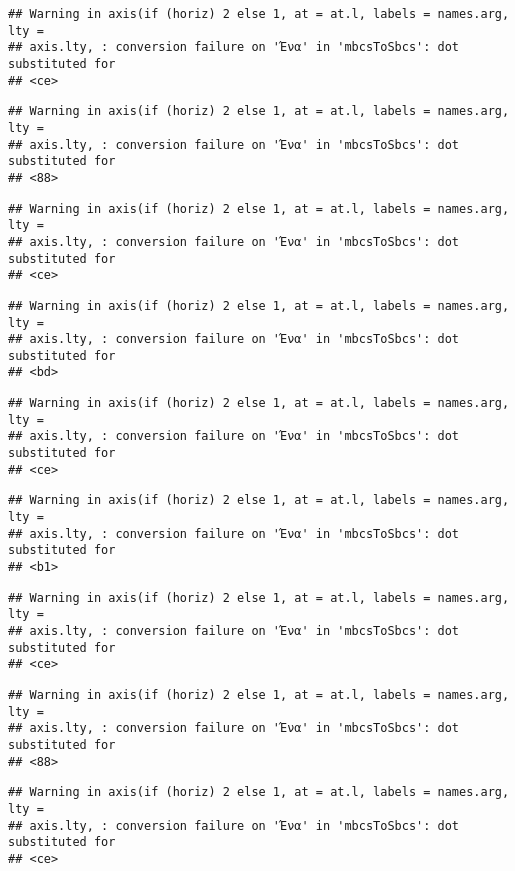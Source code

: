 \documentclass[
]{article}
\begin{document}
\begin{verbatim}
## Warning in axis(if (horiz) 2 else 1, at = at.l, labels = names.arg, lty =
## axis.lty, : conversion failure on 'Ένα' in 'mbcsToSbcs': dot substituted for
## <ce>
\end{verbatim}

\begin{verbatim}
## Warning in axis(if (horiz) 2 else 1, at = at.l, labels = names.arg, lty =
## axis.lty, : conversion failure on 'Ένα' in 'mbcsToSbcs': dot substituted for
## <88>
\end{verbatim}

\begin{verbatim}
## Warning in axis(if (horiz) 2 else 1, at = at.l, labels = names.arg, lty =
## axis.lty, : conversion failure on 'Ένα' in 'mbcsToSbcs': dot substituted for
## <ce>
\end{verbatim}

\begin{verbatim}
## Warning in axis(if (horiz) 2 else 1, at = at.l, labels = names.arg, lty =
## axis.lty, : conversion failure on 'Ένα' in 'mbcsToSbcs': dot substituted for
## <bd>
\end{verbatim}

\begin{verbatim}
## Warning in axis(if (horiz) 2 else 1, at = at.l, labels = names.arg, lty =
## axis.lty, : conversion failure on 'Ένα' in 'mbcsToSbcs': dot substituted for
## <ce>
\end{verbatim}

\begin{verbatim}
## Warning in axis(if (horiz) 2 else 1, at = at.l, labels = names.arg, lty =
## axis.lty, : conversion failure on 'Ένα' in 'mbcsToSbcs': dot substituted for
## <b1>
\end{verbatim}

\begin{verbatim}
## Warning in axis(if (horiz) 2 else 1, at = at.l, labels = names.arg, lty =
## axis.lty, : conversion failure on 'Ένα' in 'mbcsToSbcs': dot substituted for
## <ce>
\end{verbatim}

\begin{verbatim}
## Warning in axis(if (horiz) 2 else 1, at = at.l, labels = names.arg, lty =
## axis.lty, : conversion failure on 'Ένα' in 'mbcsToSbcs': dot substituted for
## <88>
\end{verbatim}

\begin{verbatim}
## Warning in axis(if (horiz) 2 else 1, at = at.l, labels = names.arg, lty =
## axis.lty, : conversion failure on 'Ένα' in 'mbcsToSbcs': dot substituted for
## <ce>
\end{verbatim}
\end{document}
